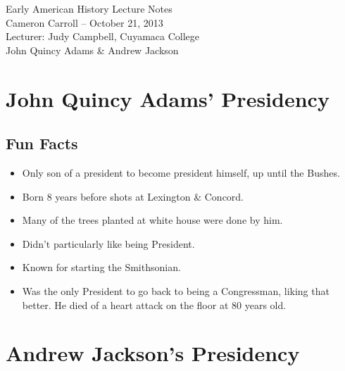 \documentclass{article}
\begin{document}
  \begin{center}
    {\small{} Early American History Lecture Notes} \\[0.6cm]
    {\small{} Cameron Carroll -- October 21, 2013} \\[0.6cm]
    {\small{} Lecturer: Judy Campbell, Cuyamaca College}\\[1cm]
    {\small{} John Quincy Adams \& Andrew Jackson}\\[1cm]
  \end{center}
  
  \tableofcontents
  \newpage

  \section{John Quincy Adams' Presidency}
    \subsection{Fun Facts}
      \begin{itemize}
        \item Only son of a president to become president himself, up until the Bushes.
        \item Born 8 years before shots at Lexington \& Concord. 
        \item Many of the trees planted at white house were done by him.
        \item Didn't particularly like being President.
        \item Known for starting the Smithsonian.
        \item Was the only President to go back to being a Congressman, liking that better. He died of a heart attack on the floor at 80 years old.
      \end{itemize}

  \section{Andrew Jackson's Presidency}
\end{document}
